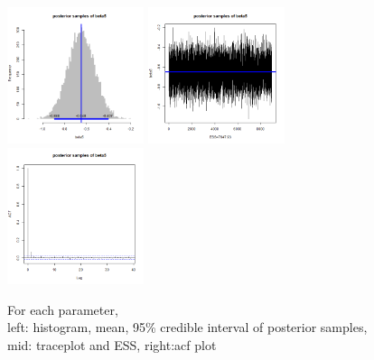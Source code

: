 \documentclass{article}
\begin{document}
\begin{figure}[!h]
    \includegraphics[width=4cm]{beta5_hist.png}
    \includegraphics[width=4cm]{beta5_traceplot.png}
    \includegraphics[width=4cm]{beta5_acf.png}
    \caption{For each parameter, \\left: histogram, mean, 95\% credible interval of posterior samples, mid: traceplot and ESS, right:acf plot}
\end{figure}
\end{document}
